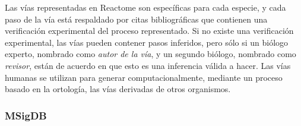 \documentclass[12pt,twoside]{reedthesis}
\begin{document}
Las vías representadas en Reactome son específicas para cada especie, y cada paso de la vía está respaldado por citas bibliográficas que contienen una verificación experimental del proceso representado. Si no existe una verificación experimental, las vías pueden contener pasos inferidos, pero sólo si un biólogo experto, nombrado como \emph{autor de la vía}, y un segundo biólogo, nombrado como \emph{revisor}, están de acuerdo en que esto es una inferencia válida a hacer. Las vías humanas se utilizan para generar computacionalmente, mediante un proceso basado en la ortología, las vías derivadas de otros organismos.

\hypertarget{msigdb}{%
\subsubsection{MSigDB}\label{msigdb}}
\end{document}
